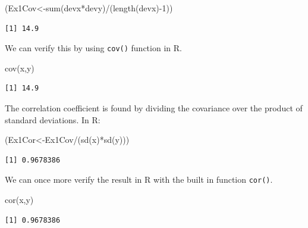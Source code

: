 \documentclass[
  letterpaper,
  DIV=11,
  numbers=noendperiod]{scrreprt}
\newenvironment{Shaded}{\begin{snugshade}}{\end{snugshade}}
\newcommand{\DecValTok}[1]{\textcolor[rgb]{0.68,0.00,0.00}{#1}}
\newcommand{\FunctionTok}[1]{\textcolor[rgb]{0.28,0.35,0.67}{#1}}
\newcommand{\NormalTok}[1]{\textcolor[rgb]{0.00,0.23,0.31}{#1}}
\newcommand{\OtherTok}[1]{\textcolor[rgb]{0.00,0.23,0.31}{#1}}
\newcommand{\SpecialCharTok}[1]{\textcolor[rgb]{0.37,0.37,0.37}{#1}}
\begin{document}
\begin{Shaded}
\begin{Highlighting}[numbers=left,,]
\NormalTok{(Ex1Cov}\OtherTok{\textless{}{-}}\FunctionTok{sum}\NormalTok{(devx}\SpecialCharTok{*}\NormalTok{devy)}\SpecialCharTok{/}\NormalTok{(}\FunctionTok{length}\NormalTok{(devx)}\SpecialCharTok{{-}}\DecValTok{1}\NormalTok{))}
\end{Highlighting}
\end{Shaded}

\begin{verbatim}
[1] 14.9
\end{verbatim}

We can verify this by using \texttt{cov()} function in R.

\begin{Shaded}
\begin{Highlighting}[numbers=left,,]
\FunctionTok{cov}\NormalTok{(x,y)}
\end{Highlighting}
\end{Shaded}

\begin{verbatim}
[1] 14.9
\end{verbatim}

The correlation coefficient is found by dividing the covariance over the
product of standard deviations. In R:

\begin{Shaded}
\begin{Highlighting}[numbers=left,,]
\NormalTok{(Ex1Cor}\OtherTok{\textless{}{-}}\NormalTok{Ex1Cov}\SpecialCharTok{/}\NormalTok{(}\FunctionTok{sd}\NormalTok{(x)}\SpecialCharTok{*}\FunctionTok{sd}\NormalTok{(y)))}
\end{Highlighting}
\end{Shaded}

\begin{verbatim}
[1] 0.9678386
\end{verbatim}

We can once more verify the result in R with the built in function
\texttt{cor()}.

\begin{Shaded}
\begin{Highlighting}[numbers=left,,]
\FunctionTok{cor}\NormalTok{(x,y)}
\end{Highlighting}
\end{Shaded}

\begin{verbatim}
[1] 0.9678386
\end{verbatim}
\end{document}
